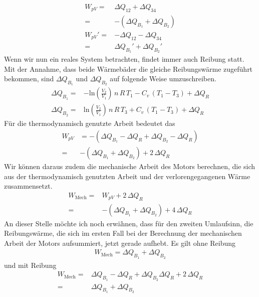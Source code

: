 \documentclass[a4paper, 12pt,]{scrartcl}
\begin{document}
\begin{align*}W_{pV}=&\Delta{Q}_{12}+\Delta{Q_{34}}\\
=&-(\Delta{Q_{B_1}}+\Delta{Q_{B_2}})\\
W_{pV}'=&-\Delta{Q}_{12}-\Delta{Q_{34}}\\
=&\Delta{Q_{B_1}}'+\Delta{Q_{B_2}}'\end{align*}
Wenn wir nun ein reales System betrachten, findet immer auch Reibung statt. Mit der Annahme, dass beide Wärmebäder die gleiche Reibungswärme zugeführt bekommen, sind $\Delta{Q_{B_1}}$ und $\Delta{Q_{B_2}}$ auf folgende Weise umzuschreiben.
\begin{align*}\Delta{Q_{B_1}}=&-\text{ln}\left(\frac{V_2}{V_1}\right)\,n\,R\,T_1-C_v\,(T_1-T_3)+\Delta{Q_R}\\
\Delta{Q_{B_2}}=&\text{ln}\left(\frac{V_2}{V_1}\right)\,n\,R\,T_3+C_v\,(T_1-T_3)+\Delta{Q_R}\end{align*}
Für die thermodynamisch genutzte Arbeit bedeutet das
\begin{align*}W_{pV}&=-(\Delta{Q_{B_1}}-\Delta{Q_R}+\Delta{Q_{B_2}}-\Delta{Q_R})\\
=&-(\Delta{Q_{B_1}}+\Delta{Q_{B_2}})+2\,\Delta{Q_R}\end{align*}
Wir können daraus zudem die mechanische Arbeit des Motors berechnen, die sich aus der thermodynamisch genutzten Arbeit und der verlorengegangenen Wärme zusammensetzt.
\begin{align*}W_\text{Mech}=&W_{pV}+2\,\Delta{Q_R}\\=&-(\Delta{Q_{B_1}}+\Delta{Q_{B_2}})+4\,\Delta{Q_R}\end{align*}
An dieser Stelle möchte ich noch erwähnen, dass für den zweiten Umlaufsinn, die Reibungswärme, die sich im ersten Fall bei der Berechnung der mechanischen Arbeit der Motors aufsummiert, jetzt gerade aufhebt. Es gilt ohne Reibung
\begin{align*}W_\text{Mech}=\Delta{Q_{B_1}}+\Delta{Q_{B_2}}\end{align*}
und mit Reibung
\begin{align*}W_\text{Mech}=&\Delta{Q_{B_1}}-\Delta{Q_R}+\Delta{Q_{B_2}}\Delta{Q_R}+2\,\Delta{Q_R}\\
=&\Delta{Q_{B_1}}+\Delta{Q_{B_2}}\end{align*}
\end{document}
